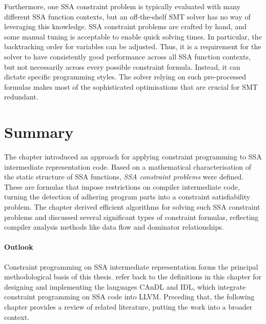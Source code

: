     Furthermore, one SSA constraint problem is typically evaluated with many
    different SSA function contexts, but
    an off-the-shelf SMT solver has no way of leveraging this knowledge.
    SSA constraint problems are crafted by hand, and some manual tuning is
    acceptable to enable quick solving times.
    In particular, the backtracking order for variables can be adjusted.
    Thus, it is a requirement for the solver to have consistently good
    performance across all SSA function contexts, but not necessarily across
    every possible constraint formula.
    Instead, it can dictate specific programming styles.
    The solver relying on such pre-processed formulas makes most of the
    sophisticated optimisations that are crucial for SMT redundant.

\section{Summary}

    The chapter introduced an approach for applying constraint programming to
    SSA intermediate representation code.
    Based on a mathematical characterisation of the static structure of SSA
    functions, {\it SSA constraint problems} were defined.
    These are formulas that impose restrictions on compiler intermediate code,
    turning the detection of adhering program parts into a constraint
    satisfiability problem.
    The chapter derived efficient algorithms for solving such SSA constraint
    problems and discussed several significant types of constraint formulas,
    reflecting compiler analysis methods like data flow and dominator
    relationships.

    \paragraph*{Outlook}
    Constraint programming on SSA intermediate representation forms the
    principal methodological basis of this thesis.
     refer back to the definitions in
    this chapter for designing and implementing the languages CAnDL and IDL,
    which integrate constraint programming on SSA code into LLVM.
    Preceding that, the following chapter provides a review of related
    literature, putting the work into a broader context. 


    